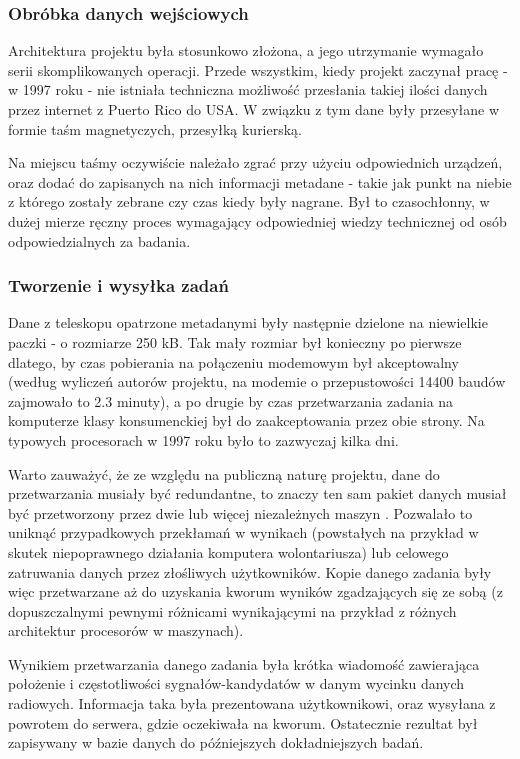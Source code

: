 \documentclass[12pt,a4paper,twoside]{article}
\begin{document}
\subsubsection{Obróbka danych wejściowych}

Architektura projektu była stosunkowo złożona, a jego utrzymanie wymagało serii skomplikowanych operacji. Przede wszystkim, kiedy projekt zaczynał pracę - w 1997 roku - nie istniała techniczna możliwość przesłania takiej ilości danych przez internet z Puerto Rico do USA. W związku z tym dane były przesyłane w formie taśm magnetyczych, przesyłką kurierską. 

Na miejscu taśmy oczywiście należało zgrać przy użyciu odpowiednich urządzeń, oraz dodać do zapisanych na nich informacji metadane - takie jak punkt na niebie z którego zostały zebrane czy czas kiedy były nagrane. Był to czasochłonny, w dużej mierze ręczny proces wymagający odpowiedniej wiedzy technicznej od osób odpowiedzialnych za badania.

\subsubsection{Tworzenie i wysyłka zadań}

Dane z teleskopu opatrzone metadanymi były następnie dzielone na niewielkie paczki - o rozmiarze 250 kB. Tak mały rozmiar był konieczny po pierwsze dlatego, by czas pobierania na połączeniu modemowym był akceptowalny (według wyliczeń autorów projektu, na modemie o przepustowości 14400 baudów zajmowało to 2.3 minuty), a po drugie by czas przetwarzania zadania na komputerze klasy konsumenckiej był do zaakceptowania przez obie strony. Na typowych procesorach w 1997 roku było to zazwyczaj kilka dni. 

Warto zauważyć, że ze względu na publiczną naturę projektu, dane do przetwarzania musiały być redundantne, to znaczy ten sam pakiet danych musiał być przetworzony przez dwie lub więcej niezależnych maszyn \cite{seti}. Pozwalało to uniknąć przypadkowych przekłamań w wynikach (powstałych na przykład w skutek niepoprawnego działania komputera wolontariusza) lub celowego zatruwania danych przez złośliwych użytkowników. Kopie danego zadania były więc przetwarzane aż do uzyskania kworum wyników zgadzających się ze sobą (z dopuszczalnymi pewnymi różnicami wynikającymi na przykład z różnych architektur procesorów w maszynach). 

Wynikiem przetwarzania danego zadania była krótka wiadomość zawierająca położenie i częstotliwości sygnałów-kandydatów w danym wycinku danych radiowych. Informacja taka była prezentowana użytkownikowi, oraz wysyłana z powrotem do serwera, gdzie oczekiwała na kworum. Ostatecznie rezultat był zapisywany w bazie danych do późniejszych dokładniejszych badań.
\end{document}
